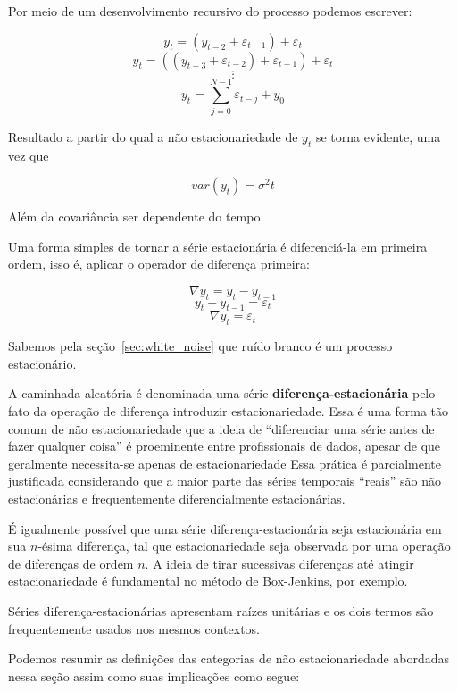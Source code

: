 Por meio de um desenvolvimento recursivo do processo podemos escrever:

$$ y_t = (y_{t-2} + \varepsilon_{t-1}) + \varepsilon_{t} $$
$$ y_t = ((y_{t-3} + \varepsilon_{t-2}) + \varepsilon_{t-1}) + \varepsilon_{t} $$
$$ \vdots $$
$$ y_t = \sum_{j=0}^{N-1} \varepsilon_{t-j} + y_0$$
\vspace{1cm}

Resultado a partir do qual a não estacionariedade de $y_t$ se torna evidente,
uma vez que

$$ var(y_t) = \sigma^2 t $$

Além da covariância ser dependente do tempo.

Uma forma simples de tornar a série estacionária é diferenciá-la em primeira
ordem, isso é, aplicar o operador de diferença primeira:

$$ \nabla y_t = y_t - y_{t-1} $$
$$ y_t - y_{t-1} = \varepsilon_t$$
$$ \nabla y_t =  \varepsilon_t$$

Sabemos pela seção~\ref{sec:white_noise} que ruído branco é um processo
estacionário.

A caminhada aleatória é denominada uma série \textbf{diferença-estacionária}
pelo fato da operação de diferença introduzir estacionariedade. Essa é uma
forma tão comum de não estacionariedade que a ideia de ``diferenciar uma
série antes de fazer qualquer coisa'' é proeminente entre profissionais de
dados, apesar de que geralmente necessita-se apenas de estacionariedade
Essa prática é parcialmente justificada considerando que a maior
parte das séries temporais ``reais'' são não estacionárias e frequentemente
diferencialmente estacionárias.

É igualmente possível que uma série diferença-estacionária seja estacionária em
sua $n$-ésima diferença, tal que estacionariedade seja observada por uma
operação de diferenças de ordem $n$. A ideia de tirar sucessivas diferenças
até atingir estacionariedade é fundamental no método de Box-Jenkins, por
exemplo.

Séries diferença-estacionárias apresentam raízes unitárias e os dois termos são
frequentemente usados nos mesmos contextos.

Podemos resumir as definições das categorias de não estacionariedade abordadas
nessa seção assim como suas implicações como segue:

